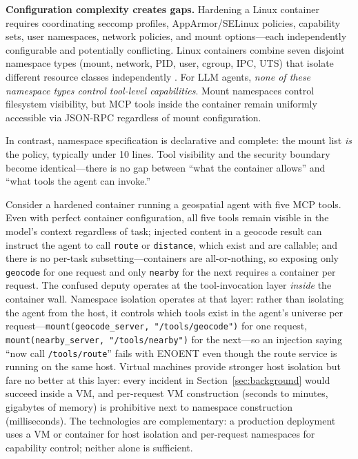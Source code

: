 \documentclass[acmsmall,screen,review]{acmart}
\begin{document}
\textbf{Configuration complexity creates gaps.} Hardening a Linux container requires coordinating seccomp profiles, AppArmor/SELinux policies, capability sets, user namespaces, network policies, and mount options---each independently configurable and potentially conflicting. Linux containers combine seven disjoint namespace types (mount, network, PID, user, cgroup, IPC, UTS) that isolate different resource classes independently \cite{nist800190}. For LLM agents, \textit{none of these namespace types control tool-level capabilities}. Mount namespaces control filesystem visibility, but MCP tools inside the container remain uniformly accessible via JSON-RPC regardless of mount configuration.

In contrast, namespace specification is declarative and complete: the mount list \textit{is} the policy, typically under 10 lines. Tool visibility and the security boundary become identical---there is no gap between ``what the container allows'' and ``what tools the agent can invoke.''

Consider a hardened container running a geospatial agent with five MCP tools. Even with perfect container configuration, all five tools remain visible in the model's context regardless of task; injected content in a geocode result can instruct the agent to call \texttt{route} or \texttt{distance}, which exist and are callable; and there is no per-task subsetting---containers are all-or-nothing, so exposing only \texttt{geocode} for one request and only \texttt{nearby} for the next requires a container per request. The confused deputy operates at the tool-invocation layer \textit{inside} the container wall. Namespace isolation operates at that layer: rather than isolating the agent from the host, it controls which tools exist in the agent's universe per request---\texttt{mount(geocode\_server, "/tools/geocode")} for one request, \texttt{mount(nearby\_server, "/tools/nearby")} for the next---so an injection saying ``now call \texttt{/tools/route}'' fails with ENOENT even though the route service is running on the same host. Virtual machines provide stronger host isolation but fare no better at this layer: every incident in Section~\ref{sec:background} would succeed inside a VM, and per-request VM construction (seconds to minutes, gigabytes of memory) is prohibitive next to namespace construction (milliseconds). The technologies are complementary: a production deployment uses a VM or container for host isolation and per-request namespaces for capability control; neither alone is sufficient.
\end{document}
